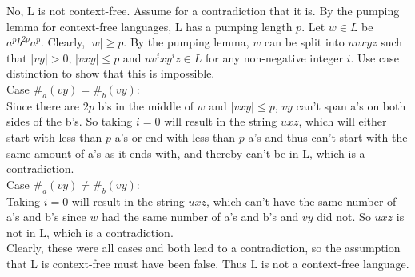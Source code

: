 \documentclass{article}
\begin{document}
No, L is not context-free. Assume for a contradiction that it is.
By the pumping lemma for context-free languages, L has a pumping length $p$.
Let $w \in L$ be $a^pb^{2p}a^p$. Clearly, $|w| \geq p$.
By the pumping lemma, $w$ can be split into $uvxyz$ such that $|vy| > 0$, $|vxy| \leq p$ and $uv^ixy^iz \in L$ for any non-negative integer $i$.
Use case distinction to show that this is impossible.\\
Case $\#_a(vy) = \#_b(vy)$:\\
Since there are $2p$ b's in the middle of $w$ and $|vxy| \leq p$, $vy$ can't span a's on both sides of the b's.
So taking $i = 0$ will result in the string $uxz$, which will either start with less than $p$ a's or end with less than $p$ a's and 
thus can't start with the same amount of a's as it ends with, and thereby can't be in L, which is a contradiction.\\
Case $\#_a(vy) \neq \#_b(vy)$:\\
Taking $i = 0$ will result in the string $uxz$, which can't have the same number of a's and b's since $w$ had the same number of a's and b's
and $vy$ did not. So $uxz$ is not in L, which is a contradiction.\\
Clearly, these were all cases and both lead to a contradiction, so the assumption that L is context-free must have been false.
Thus L is not a context-free language.
\end{document}
